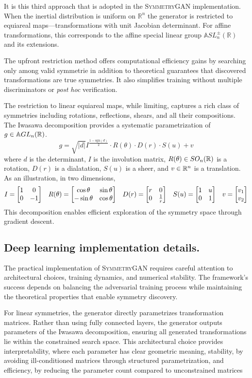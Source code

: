     It is this third approach that is adopted in the \textsc{SymmetryGAN} implementation.
    When the inertial distribution is uniform on \(\mathbb{R}^n\) the generator is restricted to equiareal maps---transformations with unit Jacobian determinant.
    For affine transformations, this corresponds to the affine special linear group \(\mathbb{A}SL^\pm_n(\mathbb{R})\) and its extensions.

    The upfront restriction method offers computational efficiency gains by searching only among valid symmetrie in addition to theoretical guarantees that discovered transformations are true symmetries.
    It also simplifies training without multiple discriminators or \textit{post hoc} verification.

    The restriction to linear equiareal maps, while limiting, captures a rich class of symmetries including rotations, reflections, shears, and all their compositions.
    The Iwasawa decomposition\kd{} provides a systematic parametrization of \(g\in\mathbb{A}GL_n(\mathbb{R})\).
    \[
        g = \sqrt{|d|} I^{\frac{1-\text{sgn}(d)}{2}} \cdot R(\theta) \cdot D(r) \cdot S(u) + v
    \]
    where \(d\) is the determinant, \(I\) is the involution matrix, \(R(\theta)\in SO_n(\mathbb{R})\) is a rotation, \(D(r)\) is a dialatation, \(S(u)\) is a sheer, and \(v\in\mathbb{R}^n\) is a translation.
    As an illustration, in two dimensions,
    \[
        I = \mqty[1&0\\0&-1] \quad R(\theta) = \mqty[\cos\theta&\sin\theta\\-\sin\theta&\cos\theta] \quad D(r) = \mqty[r&0\\0&\frac1r] \quad S(u) = \mqty[1 & u\\0&1]\quad v = \mqty[v_1\\v_2]
    \]
    This decomposition enables efficient exploration of the symmetry space through gradient descent.

    \subsection{Deep learning implementation details.}

    The practical implementation of \textsc{SymmetryGAN} requires careful attention to architectural choices, training dynamics, and numerical stability.
    The framework's success depends on balancing the adversarial training process while maintaining the theoretical properties that enable symmetry discovery.
    
    For linear symmetries, the generator directly parametrizes transformation matrices.
    Rather than using fully connected layers, the generator outputs parameters of the Iwasawa decomposition, ensuring all generated transformations lie within the constrained search space.
    This architectural choice provides interpretability, where each parameter has clear geometric meaning, stability, by avoiding ill-conditioned matrices through structured parametrization, and efficiency, by reducing the parameter count compared to unconstrained matrices

